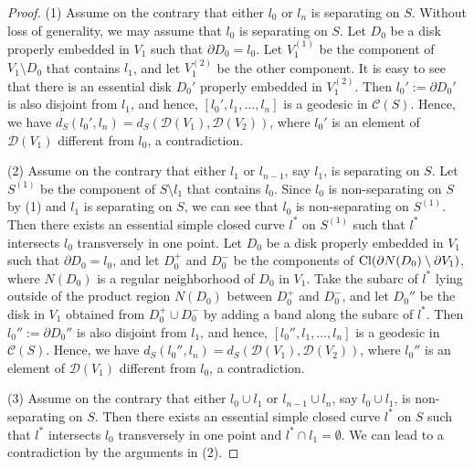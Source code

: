 \documentclass[]{aspm}
\begin{document}
\begin{proof}
(1) Assume on the contrary that either $l_0$ or $l_n$ is separating on $S$.
Without loss of generality, we may assume that $l_0$ is separating on $S$.
Let $D_0$ be a disk properly embedded in $V_1$ such that $\partial D_0=l_0$.
Let $V_1^{(1)}$ be the component of $V_1\setminus D_0$ that contains $l_1$, and let $V_1^{(2)}$ be the other component.
It is easy to see that there is an essential disk $D_0'$ properly embedded in $V_1^{(2)}$.
Then $l_0':=\partial D_0'$ is also disjoint from $l_1$, and hence, $[l_0', l_1,\dots,l_n]$ is a geodesic in $\mathcal{C}(S)$.
Hence, we have $d_S(l_0',l_n)=d_S(\mathcal{D}(V_1),\mathcal{D}(V_2))$, where $l_0'$ is an element of $\mathcal{D}(V_1)$ different from $l_0$, a contradiction.

(2) Assume on the contrary that either $l_1$ or $l_{n-1}$, say $l_1$, is separating on $S$.
Let $S^{(1)}$ be the component of $S\setminus l_1$ that contains $l_0$.
Since $l_0$ is non-separating on $S$ by (1) and $l_1$ is separating on $S$, we can see that $l_0$ is non-separating on $S^{(1)}$.
Then there exists an essential simple closed curve $l^{\ast}$ on $S^{(1)}$ such that $l^{\ast}$ intersects $l_0$ transversely in one point.
Let $D_0$ be a disk properly embedded in $V_1$ such that $\partial D_0=l_0$, and let $D_0^+$ and $D_0^-$ be the components of ${\rm Cl}(\partial N(D_0)\setminus\partial V_1)$, where $N(D_0)$ is a regular neighborhood of $D_0$ in $V_1$. 
Take the subarc of $l^{\ast}$ lying outside of the product region $N(D_0)$ between $D_0^+$ and $D_0^-$, and let $D_0''$ be the disk in $V_1$ obtained from $D_0^+\cup D_0^-$ by adding a band along the subarc of $l^{\ast}$.
Then $l_0'':=\partial D_0''$ is  also disjoint from $l_1$, and hence, $[l_0'', l_1,\dots,l_n]$ is a geodesic in $\mathcal{C}(S)$.
Hence, we have $d_S(l_0'',l_n)=d_S(\mathcal{D}(V_1),\mathcal{D}(V_2))$, where $l_0''$ is an element of $\mathcal{D}(V_1)$ different from $l_0$, a contradiction.

(3) Assume on the contrary that either $l_0\cup l_1$ or $l_{n-1}\cup l_n$, say $l_0\cup l_1$, is non-separating on $S$.
Then there exists an essential simple closed curve $l^{\ast}$ on $S$ such that $l^{\ast}$ intersects $l_0$ transversely in one point and $l^{\ast}\cap l_1=\emptyset$.
We can lead to a contradiction by the arguments in (2).
\end{proof}
\end{document}

